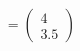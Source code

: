 \documentclass[preview]{standalone}
\begin{document}
\begin{align*}
= \begin{pmatrix} 4 \\ 3.5 \end{pmatrix}
\end{align*}
\end{document}
